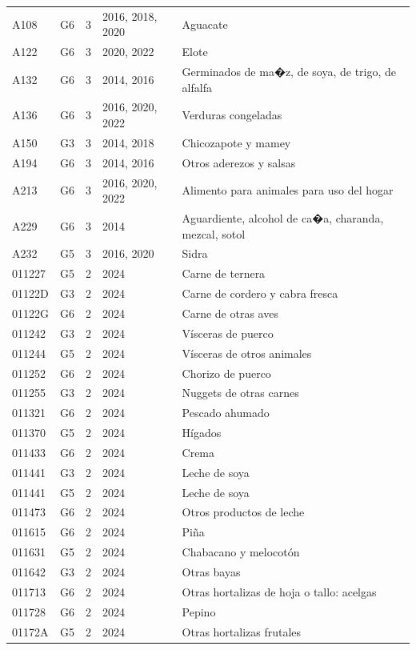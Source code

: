 \begin{table}[ht]
\begin{tabular}{llrll}
  A108 & G6 &   3 & 2016, 2018, 2020 & Aguacate \\ 
  A122 & G6 &   3 & 2020, 2022 & Elote \\ 
  A132 & G6 &   3 & 2014, 2016 & Germinados de ma�z, de soya, de trigo, de alfalfa \\ 
  A136 & G6 &   3 & 2016, 2020, 2022 & Verduras congeladas \\ 
  A150 & G3 &   3 & 2014, 2018 & Chicozapote y mamey \\ 
  A194 & G6 &   3 & 2014, 2016 & Otros aderezos y salsas \\ 
  A213 & G6 &   3 & 2016, 2020, 2022 & Alimento para animales para uso del hogar \\ 
  A229 & G6 &   3 & 2014 & Aguardiente, alcohol de ca�a, charanda, mezcal, sotol \\ 
  A232 & G5 &   3 & 2016, 2020 & Sidra \\ 
  011227 & G5 &   2 & 2024 & Carne de ternera \\ 
  01122D & G3 &   2 & 2024 & Carne de cordero y cabra fresca \\ 
  01122G & G6 &   2 & 2024 & Carne de otras aves \\ 
  011242 & G3 &   2 & 2024 & Vísceras de puerco \\ 
  011244 & G5 &   2 & 2024 & Vísceras de otros animales \\ 
  011252 & G6 &   2 & 2024 & Chorizo de puerco \\ 
  011255 & G3 &   2 & 2024 & Nuggets de otras carnes \\ 
  011321 & G6 &   2 & 2024 & Pescado ahumado \\ 
  011370 & G5 &   2 & 2024 & Hígados \\ 
  011433 & G6 &   2 & 2024 & Crema \\ 
  011441 & G3 &   2 & 2024 & Leche de soya \\ 
  011441 & G5 &   2 & 2024 & Leche de soya \\ 
  011473 & G6 &   2 & 2024 & Otros productos de leche \\ 
  011615 & G6 &   2 & 2024 & Piña \\ 
  011631 & G5 &   2 & 2024 & Chabacano y melocotón \\ 
  011642 & G3 &   2 & 2024 & Otras bayas \\ 
  011713 & G6 &   2 & 2024 & Otras hortalizas de hoja o tallo: acelgas \\ 
  011728 & G6 &   2 & 2024 & Pepino \\ 
  01172A & G5 &   2 & 2024 & Otras hortalizas frutales \\ 

\end{tabular}
\end{table}
